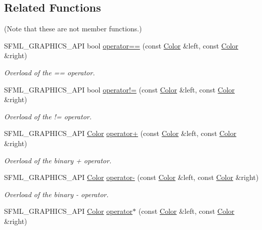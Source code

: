 \subsection*{Related Functions}
(Note that these are not member functions.) \begin{DoxyCompactItemize}
\item 
S\+F\+M\+L\+\_\+\+G\+R\+A\+P\+H\+I\+C\+S\+\_\+\+A\+PI bool \mbox{\hyperlink{classsf_1_1_color_a7498d4670c7655e8d4d91ef49cc6064e}{operator==}} (const \mbox{\hyperlink{classsf_1_1_color}{Color}} \&left, const \mbox{\hyperlink{classsf_1_1_color}{Color}} \&right)
\begin{DoxyCompactList}\small\item\em Overload of the == operator. \end{DoxyCompactList}\item 
S\+F\+M\+L\+\_\+\+G\+R\+A\+P\+H\+I\+C\+S\+\_\+\+A\+PI bool \mbox{\hyperlink{classsf_1_1_color_a5d6501b7dd05f481b79f7163899f1d92}{operator!=}} (const \mbox{\hyperlink{classsf_1_1_color}{Color}} \&left, const \mbox{\hyperlink{classsf_1_1_color}{Color}} \&right)
\begin{DoxyCompactList}\small\item\em Overload of the != operator. \end{DoxyCompactList}\item 
S\+F\+M\+L\+\_\+\+G\+R\+A\+P\+H\+I\+C\+S\+\_\+\+A\+PI \mbox{\hyperlink{classsf_1_1_color}{Color}} \mbox{\hyperlink{classsf_1_1_color_a90e79ecc276114cda519a88119ac645b}{operator+}} (const \mbox{\hyperlink{classsf_1_1_color}{Color}} \&left, const \mbox{\hyperlink{classsf_1_1_color}{Color}} \&right)
\begin{DoxyCompactList}\small\item\em Overload of the binary + operator. \end{DoxyCompactList}\item 
S\+F\+M\+L\+\_\+\+G\+R\+A\+P\+H\+I\+C\+S\+\_\+\+A\+PI \mbox{\hyperlink{classsf_1_1_color}{Color}} \mbox{\hyperlink{classsf_1_1_color_a6d9047ddbcec2bbab8519d93300bb2aa}{operator-\/}} (const \mbox{\hyperlink{classsf_1_1_color}{Color}} \&left, const \mbox{\hyperlink{classsf_1_1_color}{Color}} \&right)
\begin{DoxyCompactList}\small\item\em Overload of the binary -\/ operator. \end{DoxyCompactList}\item 
S\+F\+M\+L\+\_\+\+G\+R\+A\+P\+H\+I\+C\+S\+\_\+\+A\+PI \mbox{\hyperlink{classsf_1_1_color}{Color}} \mbox{\hyperlink{classsf_1_1_color_aa9de267d831b4ec8ba65b627e51d50c3}{operator$\ast$}} (const \mbox{\hyperlink{classsf_1_1_color}{Color}} \&left, const \mbox{\hyperlink{classsf_1_1_color}{Color}} \&right)

\end{DoxyCompactItemize}
